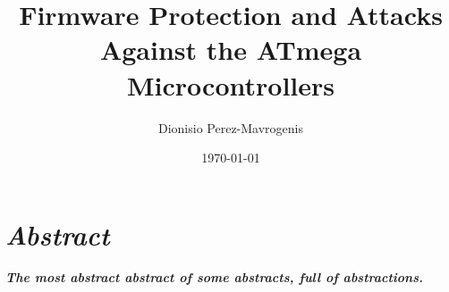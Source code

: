 \documentclass[10pt,a4paper,twocolumn]{article}
\author{Dionisio Perez-Mavrogenis}
\title{Firmware Protection and Attacks Against the ATmega Microcontrollers}
\date{\today}
\begin{document}
	\maketitle
	
\section*{\emph{Abstract}}
	\textbf{\emph{The most abstract abstract of some abstracts, full of abstractions.}}
	



	



	
	
		
	
\end{document}
